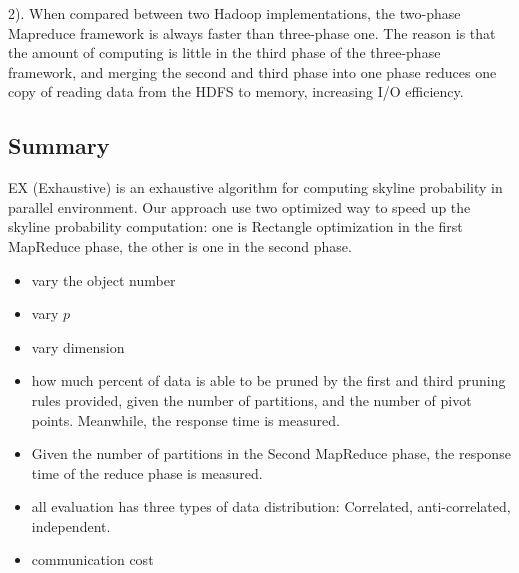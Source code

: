 2). When compared between two Hadoop implementations, the two-phase Mapreduce framework is always faster than three-phase one. The reason is that the amount of computing is little in the third phase of the three-phase framework, and merging the second and third phase into one phase reduces one copy of reading data from the HDFS to memory, increasing I/O efficiency.

\subsection{Summary}
EX (Exhaustive) is an exhaustive algorithm for computing skyline probability in parallel environment. Our approach use two optimized way to speed up the skyline probability computation: one is Rectangle optimization in the first MapReduce phase, the other is one in the second phase.

\begin{itemize}
\item vary the object number

\item vary $p$

\item vary dimension

\item how much percent of data is able to be pruned by the first and third pruning rules provided, given the number of partitions, and the number of pivot points. Meanwhile, the response time is measured.

\item Given the number of partitions in the Second MapReduce phase, the response time of the reduce phase is measured.

\item all evaluation has three types of data distribution: Correlated, anti-correlated, independent.

\item communication cost

\end{itemize}




